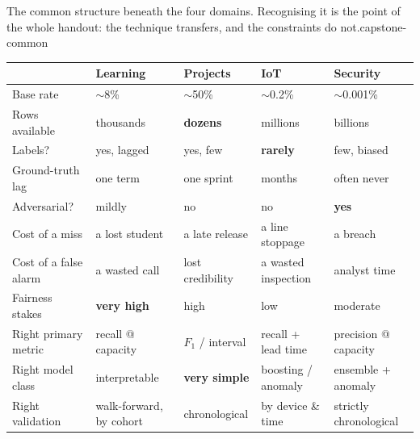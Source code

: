 {}%
{The common structure beneath the four domains. Recognising it is the point of the whole
handout: the technique transfers, and the constraints do not.}{capstone-common}

\begin{longtable}{@{}L{2.9cm}L{2.5cm}L{2.5cm}L{2.5cm}L{2.6cm}@{}}
\toprule
{}
& \textbf{Learning} & \textbf{Projects} & \textbf{IoT} & \textbf{Security} \\
\midrule
\endhead
Base rate & $\sim$8\% & $\sim$50\% & $\sim$0.2\% & $\sim$0.001\% \\
Rows available & thousands & \textbf{dozens} & millions & billions \\
Labels? & yes, lagged & yes, few & \textbf{rarely} & few, biased \\
Ground-truth lag & one term & one sprint & months & often never \\
Adversarial? & mildly & no & no & \textbf{yes} \\
Cost of a miss & a lost student & a late release & a line stoppage & a breach \\
Cost of a false alarm & a wasted call & lost credibility & a wasted inspection & analyst time \\
Fairness stakes & \textbf{very high} & high & low & moderate \\
Right primary metric & recall @ capacity & $F_1$ / interval & recall + lead time & precision @ capacity \\
Right model class & interpretable & \textbf{very simple} & boosting / anomaly & ensemble + anomaly \\
Right validation & walk-forward, by cohort & chronological & by device \& time & strictly chronological \\
\bottomrule
\end{longtable}

